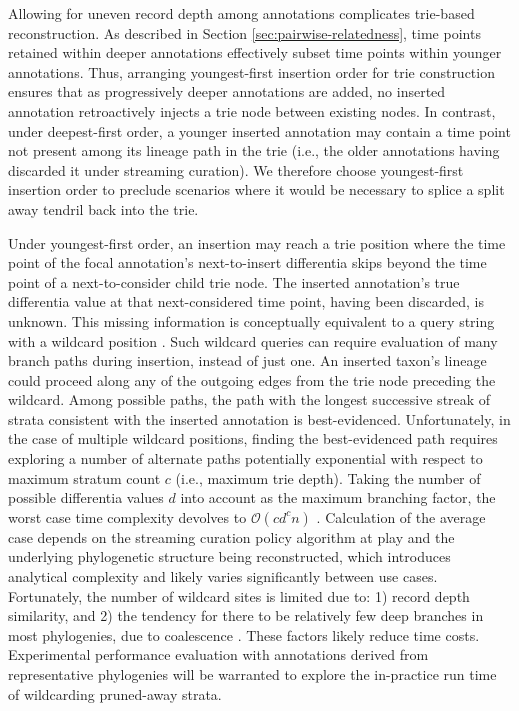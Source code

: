 Allowing for uneven record depth among annotations complicates trie-based reconstruction.
As described in Section \ref{sec:pairwise-relatedness}, time points retained within deeper annotations effectively subset time points within younger annotations.
Thus, arranging youngest-first insertion order for trie construction ensures that as progressively deeper annotations are added, no inserted annotation retroactively injects a trie node between existing nodes.
In contrast, under deepest-first order, a younger inserted annotation may contain a time point not present among its lineage path in the trie (i.e., the older annotations having discarded it under streaming curation).
We therefore choose youngest-first insertion order to preclude scenarios where it would be necessary to splice a split away tendril back into the trie.

Under youngest-first order, an insertion may reach a trie position where the time point of the focal annotation's next-to-insert differentia skips beyond the time point of a next-to-consider child trie node.
The inserted annotation's true differentia value at that next-considered time point, having been discarded, is unknown.
This missing information is conceptually equivalent to a query string with a wildcard position \citep{fukuyama2016partial}.
Such wildcard queries can require evaluation of many branch paths during insertion, instead of just one.
An inserted taxon's lineage could proceed along any of the outgoing edges from the trie node preceding the wildcard.
Among possible paths, the path with the longest successive streak of strata consistent with the inserted annotation is best-evidenced.
Unfortunately, in the case of multiple wildcard positions, finding the best-evidenced path requires exploring a number of alternate paths potentially exponential with respect to maximum stratum count $c$ (i.e., maximum trie depth).
Taking the number of possible differentia values $d$ into account as the maximum branching factor, the worst case time complexity devolves to $\mathcal{O}(c d^c n)$ \citep{fukuyama2016partial}.
Calculation of the average case depends on the streaming curation policy algorithm at play and the underlying phylogenetic structure being reconstructed, which introduces analytical complexity and likely varies significantly between use cases.
Fortunately, the number of wildcard sites is limited due to: 1) record depth similarity, and 2) the tendency for there to be relatively few deep branches in most phylogenies, due to coalescence \citep{nordborg2019coalescent, berestycki2009recent}.
These factors likely reduce time costs.
Experimental performance evaluation with annotations derived from representative phylogenies will be warranted to explore the in-practice run time of wildcarding pruned-away strata.


